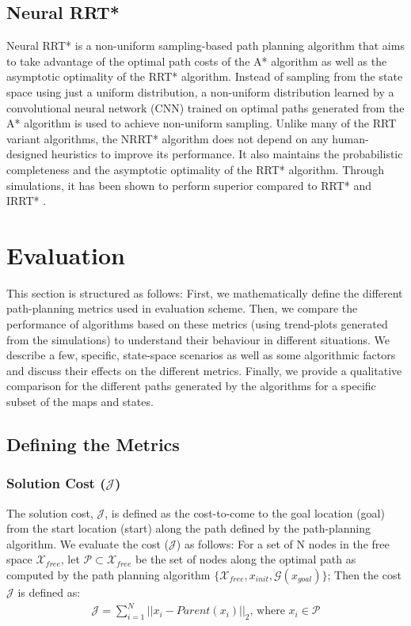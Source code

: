 \documentclass{article}
\newcommand*{\varfont}{\fontfamily{pcr}\selectfont}
\begin{document}
\subsection{Neural RRT*}
Neural RRT* is a non-uniform sampling-based path planning algorithm that aims to take advantage of the optimal path costs of the A* algorithm as well as the asymptotic optimality of the RRT* algorithm. Instead of sampling from the state space using just a uniform distribution, a non-uniform distribution learned by a convolutional neural network (CNN) trained on optimal paths generated from the A* algorithm is used to achieve non-uniform sampling. Unlike many of the RRT variant algorithms, the NRRT* algorithm does not depend on any human-designed heuristics to improve its performance. It also maintains the probabilistic completeness and the asymptotic optimality of the RRT* algorithm. Through simulations, it has been shown to perform superior compared to RRT* and IRRT* \cite{nrrt}.


\section{Evaluation}
\label{sec:Evaluation}

This section is structured as follows: First, we mathematically define the different path-planning metrics used in evaluation scheme. Then, we compare the performance of algorithms based on these metrics (using trend-plots generated from the simulations) to understand their behaviour in different situations. We describe a few, specific, state-space scenarios as well as some algorithmic factors and discuss their effects on the different metrics. Finally, we provide a qualitative comparison for the different paths generated by the algorithms for a specific subset of the maps and states.

\subsection{Defining the Metrics}

\subsubsection{Solution Cost ($\mathcal{J}$)}

The solution cost, $\mathcal{J}$, is defined as the cost-to-come to the goal location ({\varfont goal}) from the start location ({\varfont start}) along the path defined by the path-planning algorithm. We evaluate the cost ($\mathcal{J}$) as follows: For a set of N nodes in the free space $\mathcal{X}_{free}$, let $\mathcal{P} \subset \mathcal{X}_{free}$ be the set of nodes along the optimal path as computed by the path planning algorithm $\{ \mathcal{X}_{free}, x_{init}, \mathcal{G}(x_{goal})\}$; Then the cost $\mathcal{J}$ is defined as: 
\begin{align}
    \mathcal{J} = \sum_{i=1}^{N} ||x_i - Parent(x_i)||_2 \text{, where } x_i \in \mathcal{P}
\end{align}
\end{document}
